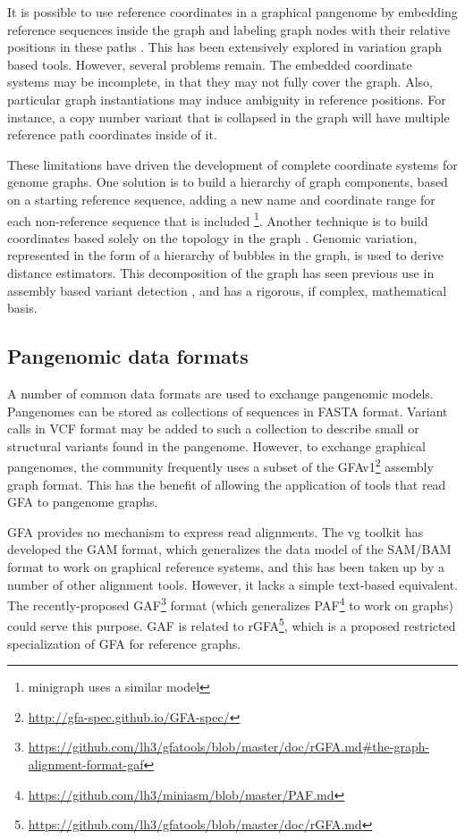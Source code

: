 It is possible to use reference coordinates in a graphical pangenome by embedding reference sequences inside the graph and labeling graph nodes with their relative positions in these paths \cite{Garrison_2018,Garrison_2019}.
This has been extensively explored in variation graph based tools.
However, several problems remain.
The embedded coordinate systems may be incomplete, in that they may not fully cover the graph.
Also, particular graph instantiations may induce ambiguity in reference positions.
For instance, a copy number variant that is collapsed in the graph will have multiple reference path coordinates inside of it.

These limitations have driven the development of complete coordinate systems for genome graphs.
One solution is to build a hierarchy of graph components, based on a starting reference sequence, adding a new name and coordinate range for each non-reference sequence that is included \cite{Rand_2017}\footnote{minigraph uses a similar model}.
Another technique is to build coordinates based solely on the topology in the graph \cite{paten2018superbubbles}.
Genomic variation, represented in the form of a hierarchy of bubbles in the graph, is used to derive distance estimators.
This decomposition of the graph has seen previous use in assembly based variant detection \cite{Iqbal_2012, Onodera_2013}, and has a rigorous, if complex, mathematical basis.


\subsection{Pangenomic data formats}

A number of common data formats are used to exchange pangenomic models.
Pangenomes can be stored as collections of sequences in FASTA format.
Variant calls in VCF format may be added to such a collection to describe small or structural variants found in the pangenome.
However, to exchange graphical pangenomes, the community frequently uses a subset of the GFAv1\footnote{\url{http://gfa-spec.github.io/GFA-spec/}} assembly graph format.
This has the benefit of allowing the application of tools that read GFA to pangenome graphs.

GFA provides no mechanism to express read alignments.
The vg toolkit has developed the GAM format, which generalizes the data model of the SAM/BAM \cite{Li_2009} format to work on graphical reference systems, and this has been taken up by a number of other alignment tools.
However, it lacks a simple text-based equivalent.
The recently-proposed GAF\footnote{\url{https://github.com/lh3/gfatools/blob/master/doc/rGFA.md#the-graph-alignment-format-gaf}} format (which generalizes PAF\footnote{\url{https://github.com/lh3/miniasm/blob/master/PAF.md}} to work on graphs) could serve this purpose.
GAF is related to rGFA\footnote{\url{https://github.com/lh3/gfatools/blob/master/doc/rGFA.md}}, which is a proposed restricted specialization of GFA for reference graphs.


